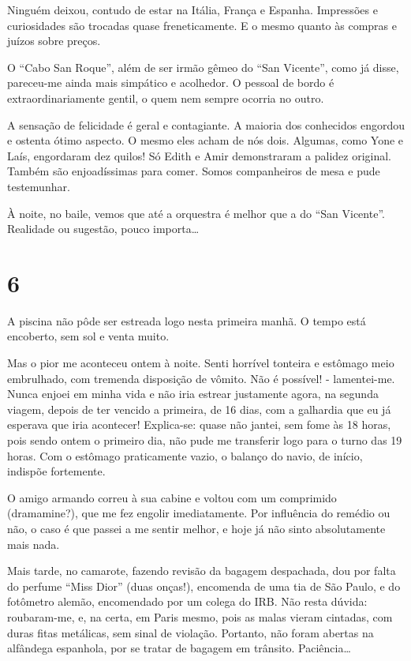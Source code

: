 Ninguém deixou, contudo de estar na Itália, França e Espanha. Impressões e curiosidades são trocadas quase freneticamente. E o mesmo quanto às compras e juízos sobre preços.

O ``Cabo San Roque'', além de ser irmão gêmeo do ``San Vicente'', como já disse, pareceu-me ainda mais simpático e acolhedor. O pessoal de bordo é extraordinariamente gentil, o quem nem sempre ocorria no outro.

A sensação de felicidade é geral e contagiante. A maioria dos conhecidos engordou e ostenta ótimo aspecto. O mesmo eles acham de nós dois. Algumas, como Yone e Laís, engordaram dez quilos! Só Edith e Amir demonstraram a palidez original. Também são enjoadíssimas para comer. Somos companheiros de mesa e pude testemunhar.

À noite, no baile, vemos que até a orquestra é melhor que a do ``San Vicente''. Realidade ou sugestão, pouco importa\ldots

\section*{6 \adfflatleafright {}}
A piscina não pôde ser estreada logo nesta primeira manhã. O tempo está encoberto, sem sol e venta muito.

Mas o pior me aconteceu ontem à noite. Senti horrível tonteira e estômago meio embrulhado, com tremenda disposição de vômito. Não é possível! - lamentei-me. Nunca enjoei em minha vida e não iria estrear justamente agora, na segunda viagem, depois de ter vencido a primeira, de 16 dias, com a galhardia que eu já esperava que iria acontecer! Explica-se: quase não jantei, sem fome às 18 horas, pois sendo ontem o primeiro dia, não pude me transferir logo para o turno das 19 horas. Com o estômago praticamente vazio, o balanço do navio, de início, indispõe fortemente.

O amigo armando correu à sua cabine e voltou com um comprimido (dramamine?), que me fez engolir imediatamente. Por influência do remédio ou não, o caso é que passei a me sentir melhor, e hoje já não sinto absolutamente mais nada.

Mais tarde, no camarote, fazendo revisão da bagagem despachada, dou por falta do perfume ``Miss Dior'' (duas onças!), encomenda de uma tia de São Paulo, e do fotômetro alemão, encomendado por um colega do IRB. Não resta dúvida: roubaram-me, e, na certa, em Paris mesmo, pois as malas vieram cintadas, com duras fitas metálicas, sem sinal de violação. Portanto, não foram abertas na alfândega espanhola, por se tratar de bagagem em trânsito. Paciência\ldots

